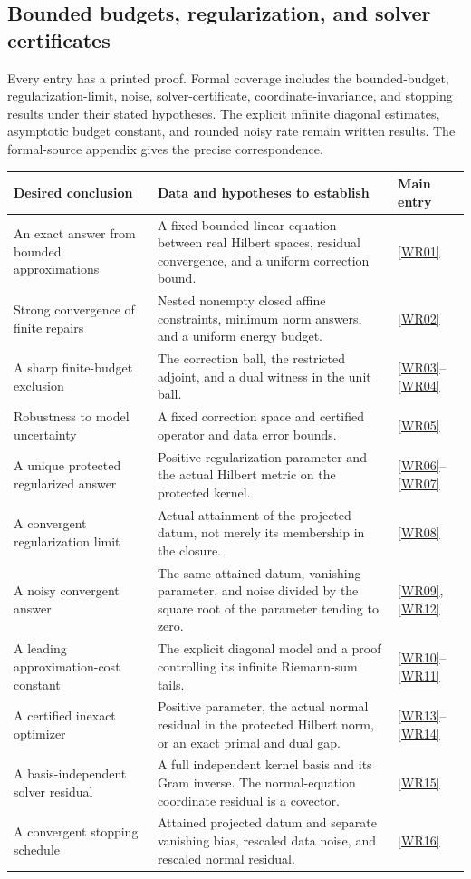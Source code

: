 \subsection{Bounded budgets, regularization, and solver certificates}
Every entry has a printed proof. Formal coverage includes the bounded-budget, regularization-limit, noise, solver-certificate, coordinate-invariance, and stopping results under their stated hypotheses. The explicit infinite diagonal estimates, asymptotic budget constant, and rounded noisy rate remain written results. The formal-source appendix gives the precise correspondence.
\begin{longtable}{@{}p{.24\linewidth}p{.48\linewidth}p{.21\linewidth}@{}}
\toprule Desired conclusion & Data and hypotheses to establish & Main entry\\\midrule\endhead
An exact answer from bounded approximations & A fixed bounded linear equation between real Hilbert spaces, residual convergence, and a uniform correction bound. & \ref{WR01}\\[4pt]
Strong convergence of finite repairs & Nested nonempty closed affine constraints, minimum norm answers, and a uniform energy budget. & \ref{WR02}\\[4pt]
A sharp finite-budget exclusion & The correction ball, the restricted adjoint, and a dual witness in the unit ball. & \ref{WR03}--\ref{WR04}\\[4pt]
Robustness to model uncertainty & A fixed correction space and certified operator and data error bounds. & \ref{WR05}\\[4pt]
A unique protected regularized answer & Positive regularization parameter and the actual Hilbert metric on the protected kernel. & \ref{WR06}--\ref{WR07}\\[4pt]
A convergent regularization limit & Actual attainment of the projected datum, not merely its membership in the closure. & \ref{WR08}\\[4pt]
A noisy convergent answer & The same attained datum, vanishing parameter, and noise divided by the square root of the parameter tending to zero. & \ref{WR09}, \ref{WR12}\\[4pt]
A leading approximation-cost constant & The explicit diagonal model and a proof controlling its infinite Riemann-sum tails. & \ref{WR10}--\ref{WR11}\\[4pt]
A certified inexact optimizer & Positive parameter, the actual normal residual in the protected Hilbert norm, or an exact primal and dual gap. & \ref{WR13}--\ref{WR14}\\[4pt]
A basis-independent solver residual & A full independent kernel basis and its Gram inverse. The normal-equation coordinate residual is a covector. & \ref{WR15}\\[4pt]
A convergent stopping schedule & Attained projected datum and separate vanishing bias, rescaled data noise, and rescaled normal residual. & \ref{WR16}\\\bottomrule
\end{longtable}

